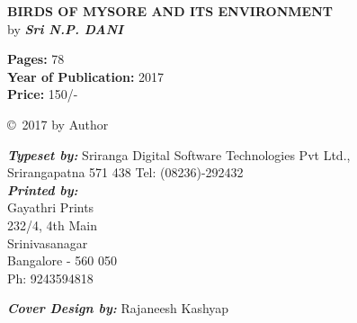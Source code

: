 \thispagestyle{empty}
\noindent
{\bf BIRDS OF MYSORE AND ITS ENVIRONMENT}\\ 
{by \sl\bfseries Sri N.P. DANI}
\vfill


\noindent
{\bf Pages:} 78\\
{\bf Year of Publication:} 2017\\
{\bf Price:} 150/-
\vfill

\noindent
\copyright\ 2017 by Author\\ 
\vfill

\noindent
{\sl\bfseries Typeset by:} Sriranga Digital Software Technologies Pvt Ltd.,\\ 
Srirangapatna 571 438 Tel: (08236)-292432\\

\noindent
{\sl\bfseries Printed by:}\\
{Gayathri Prints}\\
232/4, 4th Main\\
Srinivasanagar\\
Bangalore - 560 050\\
Ph: 9243594818


\noindent
{\sl\bfseries Cover Design by:} Rajaneesh Kashyap
